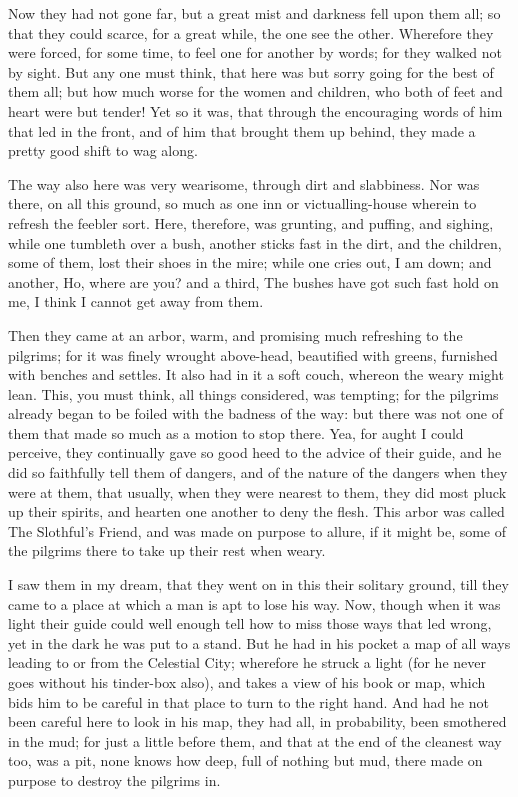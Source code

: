 Now they had not gone far, but a great mist and darkness fell upon them all; so that they could scarce, for a great while, the one see the other. Wherefore they were forced, for some time, to feel one for another by words; for they walked not by sight. But any one must think, that here was but sorry going for the best of them all; but how much worse for the women and children, who both of feet and heart were but tender! Yet so it was, that through the encouraging words of him that led in the front, and of him that brought them up behind, they made a pretty good shift to wag along.

The way also here was very wearisome, through dirt and slabbiness. Nor was there, on all this ground, so much as one inn or victualling-house wherein to refresh the feebler sort. Here, therefore, was grunting, and puffing, and sighing, while one tumbleth over a bush, another sticks fast in the dirt, and the children, some of them, lost their shoes in the mire; while one cries out, I am down; and another, Ho, where are you? and a third, The bushes have got such fast hold on me, I think I cannot get away from them.

Then they came at an arbor, warm, and promising much refreshing to the pilgrims; for it was finely wrought above-head, beautified with greens, furnished with benches and settles. It also had in it a soft couch, whereon the weary might lean. This, you must think, all things considered, was tempting; for the pilgrims already began to be foiled with the badness of the way: but there was not one of them that made so much as a motion to stop there. Yea, for aught I could perceive, they continually gave so good heed to the advice of their guide, and he did so faithfully tell them of dangers, and of the nature of the dangers when they were at them, that usually, when they were nearest to them, they did most pluck up their spirits, and hearten one another to deny the flesh. This arbor was called The Slothful's Friend, and was made on purpose to allure, if it might be, some of the pilgrims there to take up their rest when weary.

I saw them in my dream, that they went on in this their solitary ground, till they came to a place at which a man is apt to lose his way. Now, though when it was light their guide could well enough tell how to miss those ways that led wrong, yet in the dark he was put to a stand. But he had in his pocket a map of all ways leading to or from the Celestial City; wherefore he struck a light (for he never goes without his tinder-box also), and takes a view of his book or map, which bids him to be careful in that place to turn to the right hand. And had he not been careful here to look in his map, they had all, in probability, been smothered in the mud; for just a little before them, and that at the end of the cleanest way too, was a pit, none knows how deep, full of nothing but mud, there made on purpose to destroy the pilgrims in.

